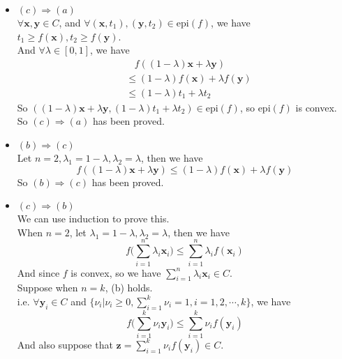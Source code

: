 \documentclass[10pt]{article}
\renewcommand{\mathbf}{\boldsymbol}
\begin{document}
\begin{enumerate}
\begin{itemize}
    \item $ (c) \Rightarrow (a)$\\
    $\forall\mathbf{x},\mathbf{y}\in C$, and $\forall(\mathbf{x},t_1),(\mathbf{y},t_2)\in\text{epi}(f)$, we have $t_1\geq f(\mathbf{x}),t_2\geq f(\mathbf{y})$.\\
    And $\forall\lambda\in[0,1]$, we have
    \begin{align*}
        &\ \ \ \ f((1-\lambda)\mathbf{x}+\lambda\mathbf{y})\\
        &\leq (1-\lambda)f(\mathbf{x})+\lambda f(\mathbf{y})\\
        &\leq (1-\lambda)t_1+\lambda t_2
    \end{align*}
    So $((1-\lambda)\mathbf{x}+\lambda \mathbf{y},(1-\lambda)t_1+\lambda t_2)\in\text{epi}(f)$, so $\text{epi}(f)$ is convex.\\
    So $ (c) \Rightarrow (a)$ has been proved.\\
    
    \item $ (b) \Rightarrow (c)$\\
    Let $n=2,\lambda_1=1-\lambda,\lambda_2=\lambda$, then we have
    $$f((1-\lambda)\mathbf{x}+\lambda \mathbf{y})\leq (1-\lambda)f(\mathbf{x})+\lambda f(\mathbf{y})$$
    So $ (b) \Rightarrow (c)$ has been proved.\\
    
    \item $ (c) \Rightarrow (b)$\\
    We can use induction to prove this.\\
    When $n=2$, let $\lambda_1=1-\lambda,\lambda_2=\lambda$, then we have
    $$f\Big(\sum\limits_{i=1}^n \lambda_i\mathbf{x}_i\Big)\leq \sum\limits_{i=1}^n \lambda_if(\mathbf{x}_i)$$
    And since $f$ is convex, so we have $\sum\limits_{i=1}^n\lambda_i\mathbf{x}_i\in C$.\\

    Suppose when $n=k$, (b) holds.\\
    i.e. $\forall\mathbf{y}_i\in C$ and $\{\nu_i|\nu_i\geq0, \sum\limits_{i=1}^k \nu_i=1, i=1,2,\cdots,k\}$, we have
    $$f\Big(\sum\limits_{i=1}^k \nu_i\mathbf{y}_i\Big)\leq \sum\limits_{i=1}^k \nu_if(\mathbf{y}_i)$$
    And also suppose that $\mathbf{z}=\sum\limits_{i=1}^k \nu_if(\mathbf{y}_i)\in C$.\\
    

\end{itemize}
\end{enumerate}
\end{document}
